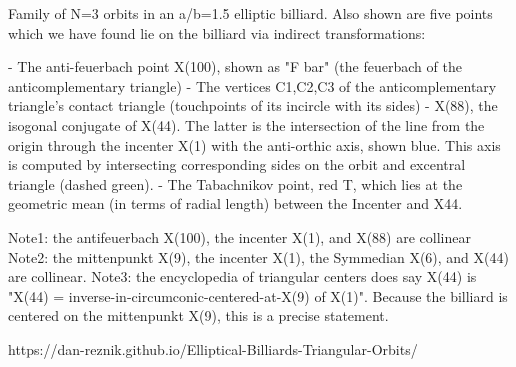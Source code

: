 Family of N=3 orbits in an a/b=1.5 elliptic billiard. Also shown are five points which we have found lie on the billiard via indirect transformations:

- The anti-feuerbach point X(100), shown as "F bar" (the feuerbach of the anticomplementary triangle)
- The vertices C1,C2,C3 of the anticomplementary triangle's contact triangle (touchpoints of its incircle with its sides)
- X(88), the isogonal conjugate of X(44). The latter is the intersection of the line from the origin through the incenter X(1) with the anti-orthic axis, shown blue. This axis is computed by intersecting corresponding sides on the orbit and excentral triangle (dashed green).
- The Tabachnikov point, red T, which lies at the geometric mean (in terms of radial length) between the Incenter and X44.

Note1: the antifeuerbach X(100), the incenter X(1), and X(88) are collinear
Note2: the mittenpunkt X(9), the incenter X(1), the Symmedian X(6), and X(44) are collinear.
Note3: the encyclopedia of triangular centers does say X(44) is "X(44) = inverse-in-circumconic-centered-at-X(9) of X(1)". Because the billiard is centered on the mittenpunkt X(9), this is a precise statement.

https://dan-reznik.github.io/Elliptical-Billiards-Triangular-Orbits/